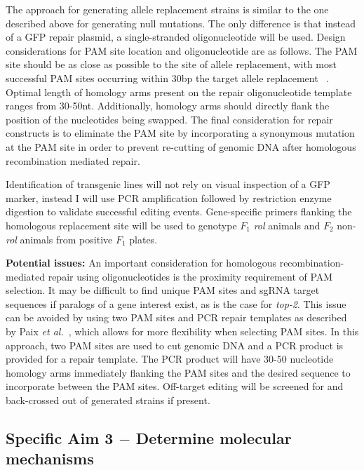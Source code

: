 \documentclass[12pt]{article}
\begin{document}
The approach for generating allele replacement strains is similar to the one described above for generating null mutations. The only difference is that instead of a GFP repair plasmid, a single-stranded oligonucleotide will be used. Design considerations for PAM site location and oligonucleotide are as follows. The PAM site should be as close as possible to the site of allele replacement, with most successful PAM sites occurring within 30bp the target allele replacement ~\cite{Arribere:2014ku,Paix:2014eu}. Optimal length of homology arms present on the repair oligonucleotide template ranges from 30-50nt. Additionally, homology arms should directly flank the position of the nucleotides being swapped. The final consideration for repair constructs is to eliminate the PAM site by incorporating a synonymous mutation at the PAM site in order to prevent re-cutting of genomic DNA after homologous recombination mediated repair. 
\vspace{5pt}

Identification of transgenic lines will not rely on visual inspection of a GFP marker, instead I will use PCR amplification followed by restriction enzyme digestion to validate successful editing events. Gene-specific primers flanking the homologous replacement site will be used to genotype $F_{1}$ {\it rol} animals and $F_{2}$ non-{\it rol} animals from positive $F_{1}$ plates. 
\vspace{5pt}

{\bf Potential issues: }An important consideration for homologous recombination-mediated repair using oligonucleotides is the proximity requirement of PAM selection. It may be difficult to find unique PAM sites and sgRNA target sequences if paralogs of a gene interest exist, as is the case for {\it top-2}. This issue can be avoided by using two PAM sites and PCR repair templates as described by Paix {\it et al.}~\cite{Paix:2014eu}, which allows for more flexibility when selecting PAM sites. In this approach, two PAM sites are used to cut genomic DNA and a PCR product is provided for a repair template. The PCR product will have 30-50 nucleotide homology arms immediately flanking the PAM sites and the desired sequence to incorporate between the PAM sites. Off-target editing will be screened for and back-crossed out of generated strains if present.
\vspace{-5pt}
\subsection{Specific Aim 3 $-$ Determine molecular mechanisms
}\label{Aim3}
\end{document}
